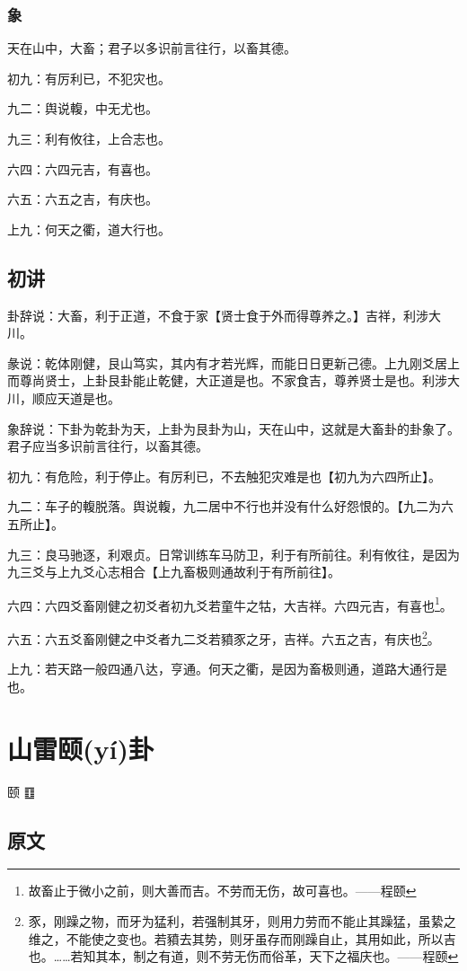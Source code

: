 \documentclass[12pt,oneside]{book}
\begin{document}
\subsection{象}
天在山中，大畜；君子以多识前言往行，以畜其德。

初九：有厉利已，不犯灾也。

九二：舆说輹，中无尤也。

九三：利有攸往，上合志也。

六四：六四元吉，有喜也。

六五：六五之吉，有庆也。

上九：何天之衢，道大行也。

\section{初讲}
卦辞说：大畜，利于正道，不食于家【贤士食于外而得尊养之。】吉祥，利涉大川。

彖说：乾体刚健，艮山笃实，其内有才若光辉，而能日日更新己德。上九刚爻居上而尊尚贤士，上卦艮卦能止乾健，大正道是也。不家食吉，尊养贤士是也。利涉大川，顺应天道是也。

象辞说：下卦为乾卦为天，上卦为艮卦为山，天在山中，这就是大畜卦的卦象了。君子应当多识前言往行，以畜其德。

初九：有危险，利于停止。有厉利已，不去触犯灾难是也【初九为六四所止】。

九二：车子的輹脱落。舆说輹，九二居中不行也并没有什么好怨恨的。【九二为六五所止】。

九三：良马驰逐，利艰贞。日常训练车马防卫，利于有所前往。利有攸往，是因为九三爻与上九爻心志相合【上九畜极则通故利于有所前往】。

六四：六四爻畜刚健之初爻者初九爻若童牛之牯，大吉祥。六四元吉，有喜也\footnote{故畜止于微小之前，则大善而吉。不劳而无伤，故可喜也。——程颐}。

六五：六五爻畜刚健之中爻者九二爻若豶豕之牙，吉祥。六五之吉，有庆也\footnote{豕，刚躁之物，而牙为猛利，若强制其牙，则用力劳而不能止其躁猛，虽絷之维之，不能使之变也。若豶去其势，则牙虽存而刚躁自止，其用如此，所以吉也。……若知其本，制之有道，则不劳无伤而俗革，天下之福庆也。——程颐}。

上九：若天路一般四通八达，亨通。何天之衢，是因为畜极则通，道路大通行是也。

\chapter{山雷颐(yí)卦}
颐 {\Large ䷚}

\section{原文}
\end{document}
